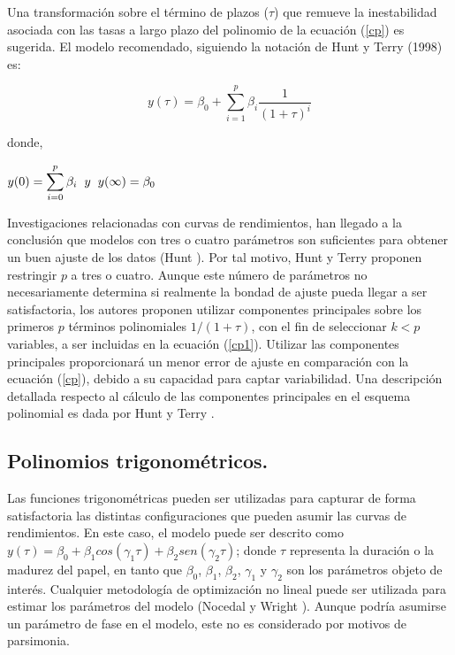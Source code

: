 \hspace*{0.4 cm} Una transformaci\'on sobre el t\'ermino de plazos ($\tau$) que remueve la
inestabilidad asociada con las tasas a largo plazo del polinomio de la ecuaci\'on (\ref{cp}) es
sugerida. El modelo recomendado, siguiendo la notaci\'on de Hunt y
Terry (1998) es:

\begin{equation}
y(\tau) = \beta_{0} + \sum_{i=1}^{p} \beta_{i} \frac{1}{(1+\tau)^i}
\label{cp1}
\end{equation} 

\noindent donde,

\begin{center}
$\displaystyle{y(0) = \sum_{i=0}^{p}\beta_{i} \hspace*{0.2 cm} y \hspace*{0.2 cm} y(\infty) = \beta_{0}   }$
\end{center} 

\vspace*{0.2 cm}

\hspace*{0.4 cm}Investigaciones relacionadas con curvas de rendimientos, han llegado a
la conclusi\'on que modelos con tres o cuatro par\'ametros son suficientes
para obtener un buen ajuste de los datos (Hunt \cite{H}). Por tal motivo,
Hunt y Terry \cite{HT} proponen restringir $p$ a tres o cuatro. Aunque este
n\'umero de par\'ametros no necesariamente determina si realmente la
bondad de ajuste pueda llegar a ser satisfactoria, los autores proponen
utilizar componentes principales sobre los primeros $p$ t\'erminos
polinomiales $1/(1 + \tau)$, con el fin de seleccionar $k<p$ variables, a ser
incluidas en la ecuaci\'on (\ref{cp1}). Utilizar las componentes principales
proporcionar\'a un menor error de ajuste en comparaci\'on con la ecuaci\'on (\ref{cp}),
debido a su capacidad para captar variabilidad. Una descripci\'on
detallada respecto al c\'alculo de las componentes principales en el
esquema polinomial es dada por Hunt y Terry \cite{HT}.

\subsection{Polinomios trigonom\'etricos.\\}



\hspace*{0.4 cm} Las funciones trigonom\'etricas pueden ser utilizadas para capturar de
forma satisfactoria las distintas configuraciones que pueden asumir las
curvas de rendimientos. En este caso, el modelo puede ser descrito como
$y(\tau) = \beta_{0} + \beta_{1}cos(\gamma_{1}\tau) + \beta_{2}sen(\gamma_{2}\tau)$; donde $\tau$ representa la duraci\'on o la
madurez del papel, en tanto que $\beta_{0}$, $\beta_{1}$, $\beta_{2}$, $\gamma_{1}$ y $\gamma_{2}$ son los par\'ametros
objeto de inter\'es. Cualquier metodolog\'ia de optimizaci\'on no lineal puede
ser utilizada para estimar los par\'ametros del modelo (Nocedal y Wright
\cite{NW}). Aunque podr\'ia asumirse un par\'ametro de fase en el modelo, este
no es considerado por motivos de parsimonia.

